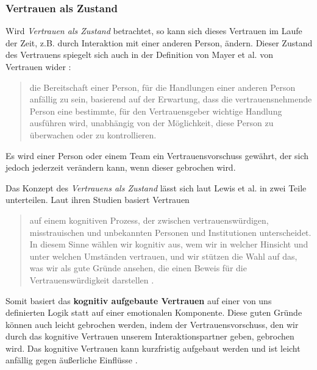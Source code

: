 \documentclass[a4paper,11pt]{article}%
\renewcommand{\\}{\vspace*{0.5\baselineskip} \newline}
\begin{document}
\subsubsection{Vertrauen als Zustand}
\label{Vertrauen als Zustand-Label}
Wird \textit{Vertrauen als Zustand} betrachtet, so kann sich dieses Vertrauen im Laufe der Zeit, z.B. durch Interaktion mit einer anderen Person, ändern. Dieser Zustand des Vertrauens spiegelt sich auch in der Definition von Mayer et al. von Vertrauen wider \citep[S. 712]{mayer1995integrative}:
\begin{quote}
\glqq{}die Bereitschaft einer Person, für die Handlungen einer anderen Person anfällig zu sein, basierend auf der Erwartung, dass die vertrauensnehmende Person eine bestimmte, für den Vertrauensgeber wichtige Handlung ausführen wird, unabhängig von der Möglichkeit, diese Person zu überwachen oder zu kontrollieren.\dq{}
\end{quote}
Es wird einer Person oder einem Team ein Vertrauensvorschuss gewährt, der sich jedoch jederzeit verändern kann, wenn dieser gebrochen wird.

Das Konzept des \textit{Vertrauens als Zustand} lässt sich laut Lewis et al. \citep[S. 970-971]{lewis1985trust} in zwei Teile unterteilen.
Laut ihren Studien basiert Vertrauen 

\begin{quote}
\glqq{}auf einem kognitiven Prozess, der zwischen vertrauenswürdigen, misstrauischen und unbekannten Personen und Institutionen unterscheidet. In diesem Sinne wählen wir kognitiv aus, wem wir in welcher Hinsicht und unter welchen Umständen vertrauen, und wir stützen die Wahl auf das, was wir als \glqq{}gute Gründe\grqq{} ansehen, die einen Beweis für die Vertrauenswürdigkeit darstellen\grqq{} \citep[S. 970]{lewis1985trust}.
\end{quote}

Somit basiert das \textbf{kognitiv aufgebaute Vertrauen} auf einer von uns definierten Logik statt auf einer emotionalen Komponente. Diese \glqq{}guten Gründe\dq{} können auch leicht gebrochen werden, indem der Vertrauensvorschuss, den wir durch das kognitive Vertrauen unserem Interaktionspartner geben, gebrochen wird.
Das kognitive Vertrauen kann kurzfristig aufgebaut werden und ist leicht anfällig gegen äußerliche Einflüsse \citep[S. 970]{lewis1985trust}. 
\end{document}
